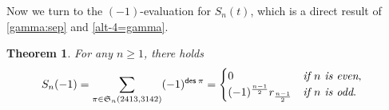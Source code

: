 \documentclass[12pt,reqno]{amsart}
\numberwithin{equation}{section}
\theoremstyle{plain}
\newtheorem{theorem}{Theorem}[section]
\theoremstyle{definition}
\def\S{\mathfrak{S}}
\def\D{\mathfrak{D}}
\def\des{\mathsf{des}}
\begin{document}
Now we turn to the $(-1)$-evaluation for $S_n(t)$, which is a direct result of \eqref{gamma:sep} and \eqref{alt-4=gamma}. %

\begin{theorem}\label{sep}
For any $n\ge 1$, there holds
\begin{align}
\label{alt:sep-odd}
S_{n}(-1)=\sum_{\pi\in\S_n(2413,3142)}(-1)^{\des\:\pi}&=\begin{cases}0 & \emph{if $n$ is even},\\
(-1)^{\frac{n-1}{2}}r_{\frac{n-1}{2}} & \emph{if $n$ is odd}.
\end{cases}
\end{align}
\end{theorem}



\end{document}
